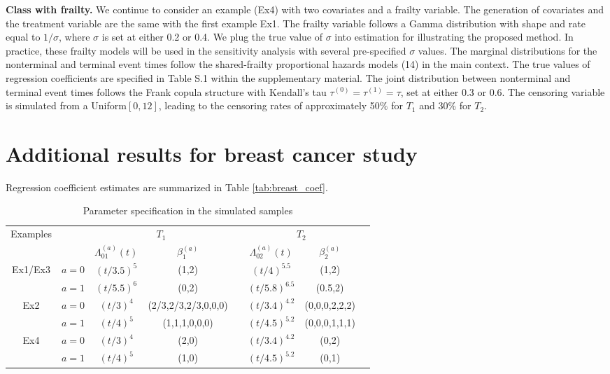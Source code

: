 \documentclass[12pt]{article}
\begin{document}
\textbf{Class with frailty.} 
We continue to consider an example (Ex4) with two covariates and a frailty variable. The generation of covariates and the treatment variable are the same with the first example Ex1. The frailty variable follows a Gamma distribution with shape and rate equal to $1/\sigma$, where $\sigma$ is set at either 0.2 or 0.4. We plug the true value of $\sigma$ into estimation for illustrating the proposed method. In practice, these frailty models will be used in the sensitivity analysis with several pre-specified $\sigma$ values. The marginal distributions for the nonterminal and terminal event times follow the shared-frailty proportional hazards models (14) in the main context. %
The true values of regression coefficients are specified in Table S.1 within the supplementary material. The joint distribution between nonterminal and terminal event times follows the Frank copula structure with Kendall's tau $\tau^{(0)}=\tau^{(1)}=\tau$, set at either 0.3 or 0.6. The censoring variable is simulated from a Uniform$[0, 12]$, leading to the censoring rates of approximately 50$\%$ for $T_1$ and 30$\%$ for $T_2$. 


\section{Additional results for breast cancer study}
\label{sec:extra real}
Regression coefficient estimates are summarized in Table \ref{tab:breast_coef}.


\begin{table}[h]
    \centering
        \caption{Parameter specification in the simulated samples }
    \label{tab:sim_param}
    \begin{tabular}{cccccccc}
    \hline \hline
    \multicolumn{1}{l}{Examples}&\multicolumn{1}{c}{}&\multicolumn{2}{c}{$T_1$}&&\multicolumn{2}{c}{$T_2$}\\
    \cline{3-4}\cline{6-7}
    &&$\Lambda_{01}^{(a)}(t)$& $\beta_{1}^{(a)}$&&$\Lambda_{02}^{(a)}(t)$&$\beta_{2}^{(a)}$\\
     \hline
    Ex1/Ex3& $a=0$     &  $(t/3.5)^5$& (1,2) && $(t/4)^{5.5}$ &(1,2) \\
    &$a=1$     &  $(t/5.5)^6$ & (0,2) && $(t/5.8)^{6.5}$ &(0.5,2) \\
    \hline
    Ex2& $a=0$     &  $(t/3)^4$& (2/3,2/3,2/3,0,0,0) && $(t/3.4)^{4.2}$ &(0,0,0,2,2,2) \\
    &$a=1$     &  $(t/4)^5$ & (1,1,1,0,0,0) && $(t/4.5)^{5.2}$ &(0,0,0,1,1,1) \\  
    \hline
    Ex4& $a=0$     &  $(t/3)^4$& (2,0) && $(t/3.4)^{4.2}$ &(0,2) \\
    &$a=1$     &  $(t/4)^5$ & (1,0) && $(t/4.5)^{5.2}$ &(0,1) \\                 
    \hline
    \end{tabular}
\end{table}
\end{document}

